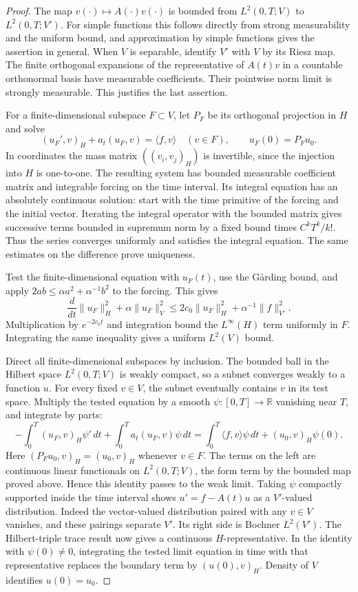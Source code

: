 \documentclass[11pt,oneside,openany]{book}
\theoremstyle{plain}
\theoremstyle{definition}
\theoremstyle{remark}
\begin{document}
\begin{proof}
The map \(v(\cdot)\mapsto A(\cdot)v(\cdot)\) is bounded from
\(L^2(0,T;V)\) to \(L^2(0,T;V')\). For simple functions this follows
directly from strong measurability and the uniform bound, and
approximation by simple functions gives the assertion in general.
When \(V\) is separable, identify \(V'\) with \(V\) by its Riesz map.
The finite orthogonal expansions of the representative of \(A(t)v\)
in a countable orthonormal basis have measurable coefficients.
Their pointwise norm limit is strongly measurable.
This justifies the last assertion.

For a finite-dimensional subspace \(F\subset V\), let \(P_F\)
be its orthogonal projection in \(H\) and solve
\[
 (u_F',v)_H+a_t(u_F,v)=\langle f,v\rangle\quad(v\in F),
 \qquad u_F(0)=P_Fu_0 .
\]
In coordinates the mass matrix \(((v_i,v_j)_H)\) is invertible,
since the injection into \(H\) is one-to-one. The resulting system
has bounded measurable coefficient matrix and integrable forcing
on the time interval. Its integral equation has an absolutely
continuous solution: start with the time primitive of the forcing
and the initial vector. Iterating the integral operator with the
bounded matrix gives successive terms bounded in supremum norm
by a fixed bound times \(C^kT^k/k!\). Thus the series converges
uniformly and satisfies the integral equation. The same estimates
on the difference prove uniqueness.

Test the finite-dimensional equation with \(u_F(t)\), use the
G{\aa}rding bound, and apply
\(2ab\leq\alpha a^2+\alpha^{-1}b^2\) to the forcing. This gives
\[
 \frac{d}{dt}\|u_F\|_H^2+\alpha\|u_F\|_V^2
       \leq 2c_0\|u_F\|_H^2+\alpha^{-1}\|f\|_{V'}^2.
\]
Multiplication by \(e^{-2c_0t}\) and integration bound the
\(L^\infty(H)\) term uniformly in \(F\). Integrating the same
inequality gives a uniform \(L^2(V)\) bound.

Direct all finite-dimensional subspaces by inclusion.
The bounded ball in the Hilbert space \(L^2(0,T;V)\) is
weakly compact, so a subnet converges weakly to a function \(u\).
For every fixed \(v\in V\), the subnet eventually contains
\(v\) in its test space. Multiply the tested equation by
a smooth \(\psi:[0,T]\to\mathbb R\) vanishing near \(T\),
and integrate by parts:
\[
 -\int_0^T (u_F,v)_H\psi'\,dt
 +\int_0^T a_t(u_F,v)\psi\,dt
 =\int_0^T\langle f,v\rangle\psi\,dt+(u_0,v)_H\psi(0).
\]
Here \((P_Fu_0,v)_H=(u_0,v)_H\) whenever \(v\in F\).
The terms on the left are continuous linear functionals on
\(L^2(0,T;V)\), the form term by the bounded map proved above.
Hence this identity passes to the weak limit.
Taking \(\psi\) compactly supported inside the time interval shows
\(u'=f-A(t)u\) as a \(V'\)-valued distribution. Indeed the
vector-valued distribution paired with any \(v\in V\) vanishes,
and these pairings separate \(V'\).
Its right side is Bochner \(L^2(V')\).
The Hilbert-triple trace result now gives a continuous
\(H\)-representative. In the identity with \(\psi(0)\ne0\),
integrating the tested limit equation in time with that
representative replaces the boundary term by \((u(0),v)_H\).
Density of \(V\) identifies \(u(0)=u_0\).


\end{proof}
\end{document}
